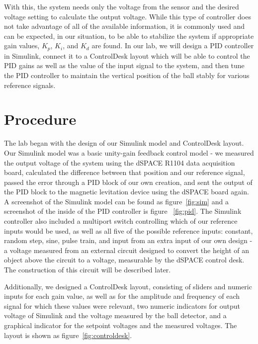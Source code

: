 \documentclass{article}
\begin{document}
With this, the system needs only the voltage from the sensor and the desired voltage setting to calculate the output voltage.  While this type of controller does not take advantage of all of the available information, it is commonly used and can be expected, in our situation, to be able to stabilize the system if appropriate gain values, $K_p$, $K_i$, and $K_d$ are found.  In our lab, we will design a PID controller in Simulink, connect it to a ControlDesk layout which will be able to control the PID gains as well as the value of the input signal to the system, and then tune the PID controller to maintain the vertical position of the ball stably for various reference signals.

\section{Procedure}
The lab began with the design of our Simulink model and ControlDesk layout.  Our Simulink model was a basic unity-gain feedback control model - we measured the output voltage of the system using the dSPACE R1104 data acquisition board, calculated the difference between that position and our reference signal, passed the error through a PID block of our own creation, and sent the output of the PID block to the magnetic levitation device using the dSPACE board again.  A screenshot of the Simulink model can be found as figure~\ref{fig:sim} and a screenshot of the inside of the PID controller is figure ~\ref{fig:pid}.  The Simulink controller also included a multiport switch controlling which of our reference inputs would be used, as well as all five of the possible reference inputs: constant, random step, sine, pulse train, and input from an extra input of our own design - a voltage measured from an external circuit designed to convert the height of an object above the circuit to a voltage, measurable by the dSPACE control desk.  The construction of this circuit will be described later.

Additionally, we designed a ControlDesk layout, consisting of sliders and numeric inputs for each gain value, as well as for the amplitude and frequency of each signal for which these values were relevant, two numeric indicators for output voltage of Simulink and the voltage measured by the ball detector, and a graphical indicator for the setpoint voltages and the measured voltages.  The layout is shown as figure~\ref{fig:controldesk}.
\end{document}
